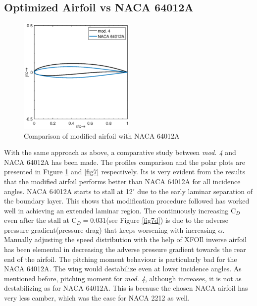 \documentclass[main.tex]{subfiles}
\begin{document}
\subsection{Optimized Airfoil vs NACA 64012A}
\begin{figure}[h]
\vspace*{-1em}
\centering
\includegraphics[width=0.5\textwidth]{./Images/Ass3/Final_Airfoil_Comp}
\caption{Comparison of modified airfoil with NACA 64012A}
\label{fig6}
\vspace*{-1em}
\end{figure}
\par With the same approach as above, a comparative study between \textit{mod. 4} and NACA 64012A\cite{airfoiltools} has been made. The profiles comparison and the polar plots are presented in Figure \ref{fig6} and \ref{fig7} respectively. Its is very evident from the results that the modified airfoil performs better than NACA 64012A for all incidence angles. NACA 64012A starts to stall at 12$^\circ$ due to the early laminar separation of the boundary layer. This shows that modification procedure followed has worked well in achieving an extended laminar region. The continuously increasing C$_D$ even after the stall at C$_D=0.031$(see Figure \ref{fig7d}) is due to the adverse pressure gradient(pressure drag) that keeps worsening with increasing $\alpha$. Manually adjusting the speed distribution with the help of XFOIl inverse airfoil has been elemental in decreasing the adverse pressure gradient towards the rear end of the airfoil. The pitching moment behaviour is particularly bad for the NACA 64012A. The wing would destabilize even at lower incidence angles. As mentioned before, pitching moment for \textit{mod. 4}, although increases, it is not as destabilizing as for NACA 64012A. This is because the chosen NACA airfoil has very less camber, which was the case for NACA 2212 as well. 
\end{document}

